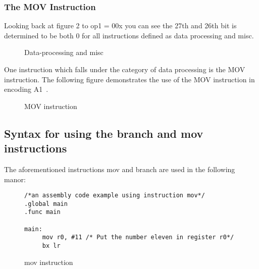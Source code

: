 \documentclass[11pt]{report}
\begin{document}
\subsubsection{The MOV Instruction}
\begin{onehalfspace}
Looking back at figure 2 to op1 = 00x you can see the 27th and 26th bit is determined to be both 0 for all instructions defined as data processing and misc. 
\end{onehalfspace}
\begin{center}
\begin{figure}[H] 
\caption{Data-processing and misc}
\end{figure}
\end{center}

\begin{onehalfspace}
One instruction which falls under the category of data processing is the MOV instruction. The following figure demonstrates the use of the MOV instruction in encoding A1~\citep[A8-194]{referenceB}. 
\end{onehalfspace}

\begin{center}
\begin{figure}[H] 
\caption{MOV instruction}
\end{figure}
\end{center}

\subsection{Syntax for using the branch and mov instructions}
\begin{onehalfspace}
The aforementioned instructions mov and branch are used in the following manor: 
\end{onehalfspace}
\begin{figure}
\begin{verbatim}
/*an assembly code example using instruction mov*/
.global main
.func main

main:
     mov r0, #11 /* Put the number eleven in register r0*/
     bx lr
\end{verbatim}
\caption{mov instruction}
\end{figure}
\end{document}
